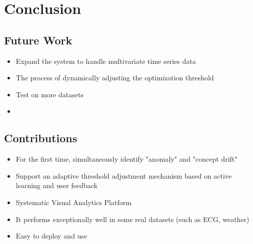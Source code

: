\chapter{Conclusion}

\section{Future Work}
\begin{itemize}
    \item Expand the system to handle multivariate time series data
    \item The process of dynamically adjusting the optimization threshold
    \item Test on more datasets  
    \item {}
\end{itemize}

\section{Contributions}
\begin{itemize}
    \item For the first time, simultaneously identify "anomaly" and "concept drift"
    \item Support an adaptive threshold adjustment mechanism based on active learning and user feedback
    \item Systematic Visual Analytics Platform
    \item It performs exceptionally well in some real datasets (such as ECG, weather)
    \item Easy to deploy and use
\end{itemize}